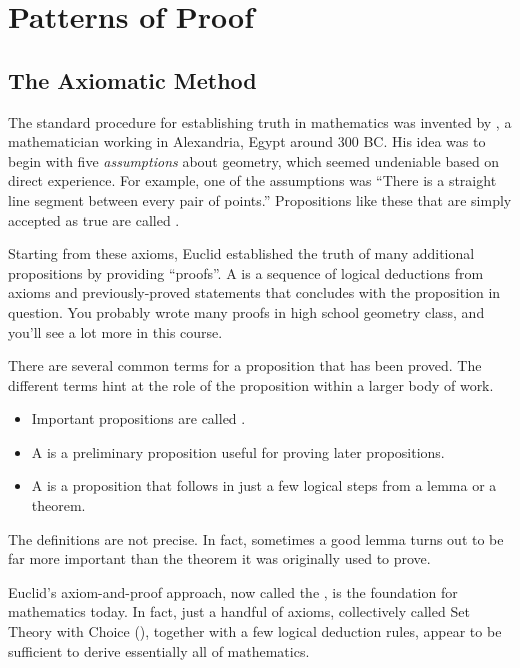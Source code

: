 \chapter{Patterns of Proof}\label{templates_chap}

\section{The Axiomatic Method}

The standard procedure for establishing truth in mathematics was
invented by , a mathematician working in Alexandria, Egypt
around 300 BC.  His idea was to begin with five \emph{assumptions}
about geometry, which seemed undeniable based on direct experience.
For example, one of the assumptions was ``There is a straight line
segment between every pair of points.''  Propositions like these that
are simply accepted as true are called .

Starting from these axioms, Euclid established the truth of many
additional propositions by providing ``proofs''.  A  is a
sequence of logical deductions from axioms and previously-proved
statements that concludes with the proposition in question.  You
probably wrote many proofs in high school geometry class, and you'll
see a lot more in this course.

There are several common terms for a proposition that has been proved.
The different terms hint at the role of the proposition within a
larger body of work.
%
\begin{itemize}
\item Important propositions are called .
\item A  is a preliminary proposition useful for proving
later propositions.
\item A  is a proposition that follows
in just a few logical steps from a lemma or a theorem.
\end{itemize}
%
The definitions are not precise.  In fact, sometimes a good lemma
turns out to be far more important than the theorem it was originally
used to prove.

Euclid's axiom-and-proof approach, now called the , is the foundation for mathematics today.  In fact, just a
handful of axioms, collectively called  Set
Theory with Choice (), together with a few logical deduction
rules, appear to be sufficient to derive essentially all of
mathematics.

